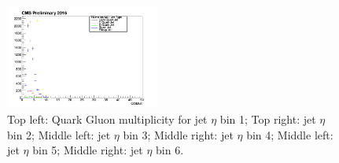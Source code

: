 \begin{figure}[htbp]
\begin{center}
  \includegraphics[width=0.45\textwidth]{sections/mc4/TopTagger/figures/_b_qgmultjetetabin5_.png}
 \end{center}
 \caption{Top left: Quark Gluon multiplicity for jet $\eta$ bin 1; Top right: jet $\eta$ bin 2; Middle left: jet $\eta$ bin 3; Middle right: jet $\eta$ bin 4; Middle left: jet $\eta$ bin 5; Middle right: jet $\eta$ bin 6.}
 \label{fig:c4ttqgmultjeteta}
\end{figure}

